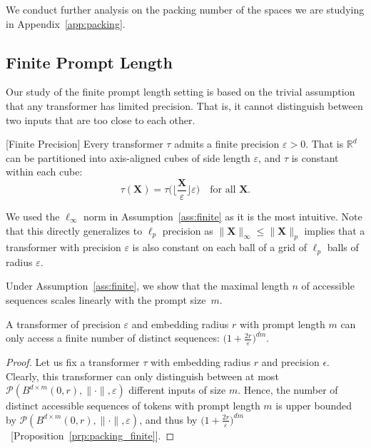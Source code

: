We conduct further analysis on the packing number of the spaces we are studying in Appendix~\ref{app:packing}.

\subsection{Finite Prompt Length}\label{sec:finite}

Our study of the finite prompt length setting is based on the trivial assumption that any transformer has limited precision. That is, it cannot distinguish between two inputs that are too close to each other.

\begin{assumption}\label{ass:finite}[Finite Precision]
Every transformer $\tau$ admits a finite precision $\varepsilon>0$. That is $\mathbb{R}^d$ can be partitioned into axis-aligned cubes of side length $\varepsilon$, and $\tau$ is constant within each cube:
\[
\tau(\mathbf X) = \tau\bigg(\Big\lfloor \frac{\mathbf X}  {\varepsilon} \Big\rfloor \varepsilon\bigg)
\quad\text{for all }\mathbf X.
\]
\end{assumption}

\begin{remark}
    We used the $\ell_\infty$ norm in Assumption~\ref{ass:finite} as it is the most intuitive. Note that this directly generalizes to $\ell_p$ precision as $\|\mathbf X\|_\infty\le\|\mathbf X\|_p$ implies that a transformer with precision $\varepsilon$ is also constant on each ball of a grid of $\ell_p$ balls of radius $\varepsilon$.
\end{remark}


Under Assumption~\ref{ass:finite}, we show that the maximal length $n$ of accessible sequences scales linearly with the prompt size~$m$.

\begin{theorem}\label{lem:finite}
    A transformer of precision $\varepsilon$ and embedding radius $r$ with prompt length $m$ can only access a finite number of distinct sequences: $\big(1+\frac {2r} {\varepsilon}\big)^{dm}$.
\end{theorem}

\begin{proof}
    Let us fix a transformer $\tau$ with embedding radius $r$ and precision $\epsilon$. Clearly, this transformer can only distinguish between at most $\mathcal{P}(B^{d\times m}(0,r),\|\cdot\|,\varepsilon)$ different inputs of size $m$. Hence, the number of distinct accessible sequences of tokens with prompt length $m$ is upper bounded by $\mathcal{P}(B^{d\times m}(0,r),\|\cdot\|,\varepsilon)$, and thus by $\big(1+\frac {2r} {\varepsilon}\big)^{dm}$~[Proposition~\ref{prp:packing_finite}].
\end{proof}

